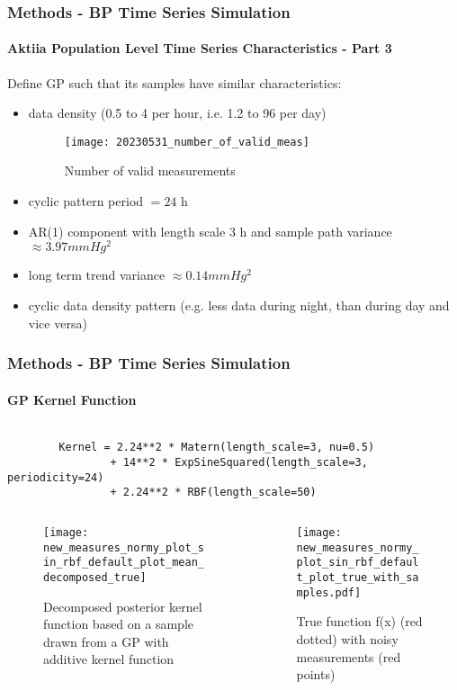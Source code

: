 \documentclass[
	8pt, %
]{beamer}
\begin{document}
\begin{frame}
	\frametitle{Methods - BP Time Series Simulation}
	\framesubtitle{Aktiia Population Level Time Series Characteristics - Part 3}

	Define GP such that its samples have similar characteristics:

	\begin{itemize}
		\item data density (0.5 to 4 per hour, i.e. 1.2 to 96 per day)
		\begin{figure}
			\texttt{[image: 20230531\_number\_of\_valid\_meas]}
			\caption{Number of valid measurements}
		\end{figure}
		\item cyclic pattern period $= 24$ h
		\item AR(1) component with length scale 3 h and sample path variance $\approx 3.97 mmHg^2$
		\item long term trend variance $\approx 0.14 mmHg^2$
		\item cyclic data density pattern (e.g. less data during night, than during day and vice versa)
	\end{itemize}

\end{frame}

\begin{frame}[fragile]
	\frametitle{Methods - BP Time Series Simulation}
	\framesubtitle{GP Kernel Function}

	\begin{verbatim}

		Kernel = 2.24**2 * Matern(length_scale=3, nu=0.5)
				+ 14**2 * ExpSineSquared(length_scale=3, periodicity=24)
				+ 2.24**2 * RBF(length_scale=50)

	\end{verbatim}

	\begin{columns}[c] %
		\begin{column}{0.5\textwidth} %
				\begin{figure}
					\texttt{[image: new\_measures\_normy\_plot\_sin\_rbf\_default\_plot\_mean\_decomposed\_true]}
					\caption{Decomposed posterior kernel function based on a sample drawn from
					a GP with additive kernel function}
				\end{figure}
		\end{column}
		\begin{column}{0.5\textwidth} %
				\begin{figure}
					\texttt{[image: new\_measures\_normy\_plot\_sin\_rbf\_default\_plot\_true\_with\_samples.pdf]}
					\caption{True function f(x) (red dotted) with noisy measurements (red points)}
				\end{figure}

		\end{column}
	\end{columns}

\end{frame}
\end{document}
